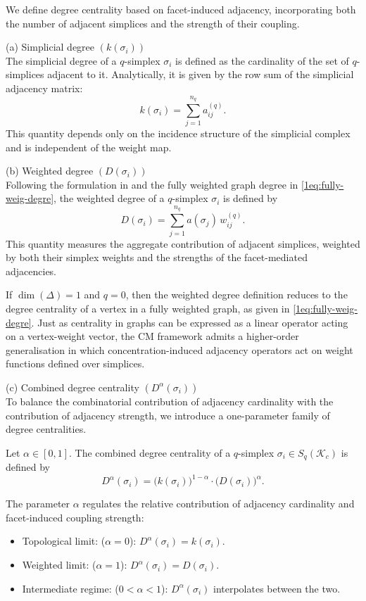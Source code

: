 \documentclass[12pt]{article}
\theoremstyle{normalhead_nobrackets}
\theoremstyle{exampstyle}
\begin{document}
We define degree centrality based on facet-induced adjacency, incorporating both the number of adjacent simplices and the strength of their coupling.

\medskip

\noindent (a) Simplicial degree $(k(\sigma_i))$ \\
The simplicial degree of a $q$-simplex $\sigma_i$ is defined as the cardinality of the set of $q$-simplices adjacent to it. Analytically, it is given by the row sum of the simplicial adjacency matrix:
\[
k(\sigma_i) = \sum_{j=1}^{n_q} a_{ij}^{(q)}.
\]
This quantity depends only on the incidence structure of the simplicial complex and is independent of the weight map.

\medskip

\noindent (b) Weighted degree $(D(\sigma_i))$ \\
Following the formulation in \cite{raj2025study} and the fully weighted graph degree in \eqref{1eq:fully-weig-degre}, the weighted degree of a $q$-simplex $\sigma_i$ is defined by
\[
D(\sigma_i)
=
\sum_{j=1}^{n_q}
a(\sigma_j)\, w_{ij}^{(q)}.
\]
This quantity measures the aggregate contribution of adjacent simplices, weighted by both their simplex weights and the strengths of the facet-mediated adjacencies.

If $\dim(\Delta) = 1$ and $q = 0$, then the weighted degree definition reduces to the degree centrality of a vertex in a fully weighted graph, as given in \eqref{1eq:fully-weig-degre}.
Just as centrality in graphs can be expressed as a linear operator acting on a vertex-weight vector, the CM framework admits a higher-order generalisation in which concentration-induced adjacency operators act on weight functions defined over simplices.

\medskip

\noindent (c) Combined degree centrality $(D^{\alpha}(\sigma_i))$ \\
To balance the combinatorial contribution of adjacency cardinality with the contribution of adjacency strength, we introduce a one-parameter family of degree centralities.

Let $\alpha \in [0,1]$. The combined degree centrality of a $q$-simplex $\sigma_i \in S_q(\mathcal{K}_c)$ is defined by
\[
D^{\alpha}(\sigma_i)
=
\bigl(k(\sigma_i)\bigr)^{1-\alpha}
\cdot
\bigl(D(\sigma_i)\bigr)^{\alpha}.
\]

The parameter $\alpha$ regulates the relative contribution of adjacency cardinality and facet-induced coupling strength:
\begin{itemize}
    \item[(i)] {Topological limit}: ($\alpha = 0$): $D^{\alpha}(\sigma_i) = k(\sigma_i)$.
    \item[(ii)] {Weighted limit}: ($\alpha = 1$): $D^{\alpha}(\sigma_i) = D(\sigma_i)$.
    \item[(iii)] {Intermediate regime}: ($0 < \alpha < 1$): $D^{\alpha}(\sigma_i)$ interpolates between the two.
\end{itemize}
\end{document}
